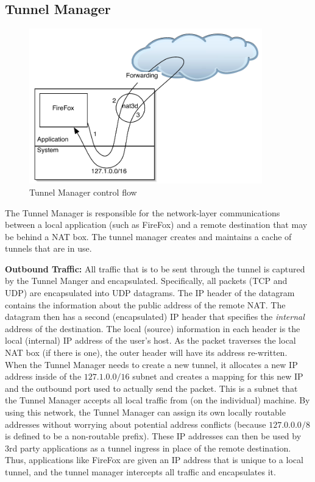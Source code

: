 \subsection{Tunnel Manager}

\begin{figure}
\begin{center}
\includegraphics[width=0.9\textwidth]{figs/tun-control-flow}
\end{center}
\caption{Tunnel Manager control flow}
\label{fig:tun-control-flow}
\end{figure}

The Tunnel Manager is responsible for the network-layer communications between a local application (such as FireFox) and a remote
destination that may be behind a NAT box.  The tunnel manager creates and maintains a cache of tunnels that are in use.  

{\bf Outbound Traffic:} All traffic that is
to be sent through the tunnel is captured by the Tunnel Manger and encapsulated.  Specifically, all packets (TCP and UDP) are encapsulated
into UDP datagrams.  The IP header of the datagram contains the information about the public address of the remote NAT.  The datagram then
has a second (encapsulated) IP header that specifies the \emph{internal} address of the  destination.  The local (source) information in
each header is the local (internal) IP address of the user's host.  As the packet traverses the local NAT box (if there is one), the outer
header will have its address re-written.  When the Tunnel Manager needs
to create a new tunnel, it allocates a new IP address inside of the $127.1.0.0/16$ subnet and creates a mapping for this new IP and the 
outbound port used to actually send the packet.  This is a subnet that the Tunnel Manager accepts
all local traffic from (on the individual) machine.  By using this network, the Tunnel Manager can assign its own locally routable addresses
without worrying about potential address conflicts (because $127.0.0.0/8$ is defined to be a non-routable prefix).  These IP addresses can 
then be used by 3rd party applications as a tunnel ingress in place of the remote destination.  Thus, applications like FireFox are given an
IP address that is unique to a local tunnel, and the tunnel manager intercepts all traffic and encapsulates it.  


